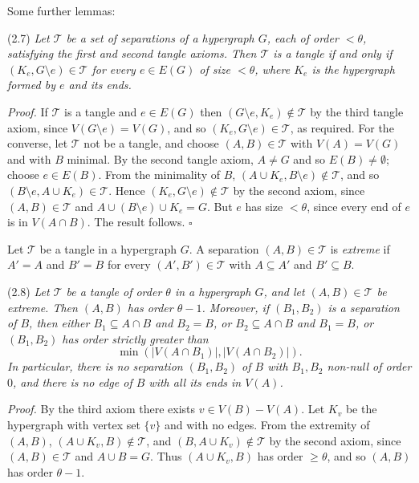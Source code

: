 Some further lemmas:

\stmt
(2.7) \textit{Let $\mathscr{T}$ be a set of separations of a hypergraph $G$, each of order $<\theta$, satisfying the first and second tangle axioms. Then $\mathscr{T}$ is a tangle if and only if $(K_e, G\setminus e)\in \mathscr{T}$ for every $e\in E(G)$ of size $<\theta$, where $K_e$ is the hypergraph formed by $e$ and its ends.}

\textit{Proof.} If $\mathscr{T}$ is a tangle and $e\in E(G)$ then $(G\setminus e, K_e)\notin \mathscr{T}$ by the third tangle axiom, since $V(G\setminus e) = V(G)$, and so $(K_e, G\setminus e)\in \mathscr{T}$, as required. For the converse, let $\mathscr{T}$ not be a tangle, and choose $(A, B)\in \mathscr{T}$ with $V(A) = V(G)$ and with $B$ minimal. By the second tangle axiom, $A\ne G$ and so $E(B)\ne \emptyset$; choose $e\in E(B)$. From the minimality of $B$, $(A\cup K_e, B\setminus e)\notin \mathscr{T}$, and so $(B\setminus e, A\cup K_e)\in \mathscr{T}$. Hence $(K_e, G\setminus e)\notin \mathscr{T}$ by the second axiom, since $(A, B)\in \mathscr{T}$ and $A\cup (B\setminus e)\cup K_e = G$. But $e$ has size $<\theta$, since every end of $e$ is in $V(A\cap B)$. The result follows. $\square$

Let $\mathscr{T}$ be a tangle in a hypergraph $G$. A separation $(A, B)\in \mathscr{T}$ is \textit{extreme} if $A' = A$ and $B' = B$ for every $(A', B')\in \mathscr{T}$ with $A\subseteq A'$ and $B'\subseteq B$.

\stmt
(2.8) \textit{Let $\mathscr{T}$ be a tangle of order $\theta$ in a hypergraph $G$, and let $(A, B)\in \mathscr{T}$ be extreme. Then $(A, B)$ has order $\theta - 1$. Moreover, if $(B_1, B_2)$ is a separation of $B$, then either $B_1\subseteq A\cap B$ and $B_2 = B$, or $B_2\subseteq A\cap B$ and $B_1 = B$, or $(B_1, B_2)$ has order strictly greater than}
\begin{equation*}
\min(|V(A\cap B_1)|, |V(A\cap B_2)|).
\end{equation*}
\textit{In particular, there is no separation $(B_1, B_2)$ of $B$ with $B_1, B_2$ non-null of order $0$, and there is no edge of $B$ with all its ends in $V(A)$.}

\textit{Proof.} By the third axiom there exists $v\in V(B) - V(A)$. Let $K_v$ be the hypergraph with vertex set $\{v\}$ and with no edges. From the extremity of $(A, B)$, $(A\cup K_v, B)\notin \mathscr{T}$, and $(B, A\cup K_v)\notin \mathscr{T}$ by the second axiom, since $(A, B)\in \mathscr{T}$ and $A\cup B = G$. Thus $(A\cup K_v, B)$ has order $\ge \theta$, and so $(A, B)$ has order $\theta - 1$.

